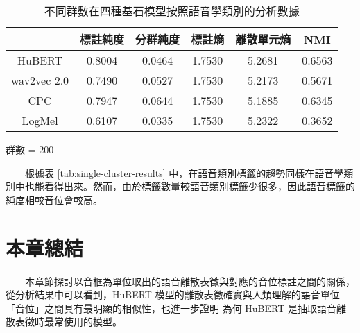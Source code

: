 \begin{table}[!htbp]
            \vspace{0.2cm}        

            \begin{subtable}[t]{\textwidth}
                \centering
                \begin{tabular}{|c|c|c|c|c|c|} \hline 
                                & 標註純度 & 分群純度 & 標註熵 & 離散單元熵 &     NMI \\ \hline 
                    HuBERT      &           0.8004 &   0.0464 &         1.7530 &     5.2681 &  0.6563 \\ \hline    %
                    wav2vec 2.0 &           0.7490 &   0.0527 &         1.7530 &     5.2173 &  0.5671 \\ \hline    %
                    CPC         &           0.7947 &   0.0644 &         1.7530 &     5.1885 &  0.6345 \\ \hline    %
                    LogMel      &           0.6107 &   0.0335 &         1.7530 &     5.2322 &  0.3652 \\ \hline    %
                \end{tabular}
                \caption{群數 = 200}
                \label{tab:ch3-clu200}
            \end{subtable}        

            \caption{不同群數在四種基石模型按照語音學類別的分析數據}
            \label{tab:single-cluster-phonetype-results}
        \end{table}
        　　根據表 \ref{tab:single-cluster-results} 中，在語音類別標籤的趨勢同樣在語音學類別中也能看得出來。然而，由於標籤數量較語音類別標籤少很多，因此語音標籤的純度相較音位會較高。


\section{本章總結}

　　本章節探討以音框為單位取出的語音離散表徵與對應的音位標註之間的關係，從分析結果中可以看到，HuBERT 模型的離散表徵確實與人類理解的語音單位「音位」之間具有最明顯的相似性，也進一步證明
為何 HuBERT 是抽取語音離散表徵時最常使用的模型。

